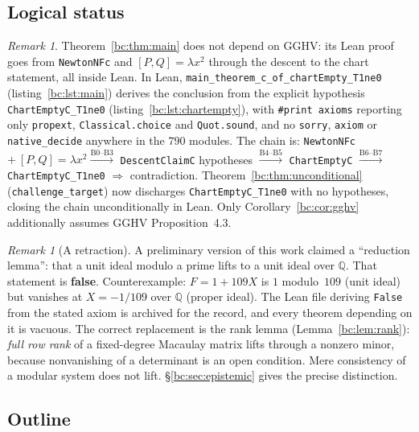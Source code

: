 \documentclass[a4paper,11pt]{article}
\theoremstyle{plain}
\theoremstyle{definition}
\theoremstyle{remark}
\newtheorem{remark}[theorem]{Remark}
\begin{document}
\subsection{Logical status}

\begin{remark}\label{bc:rem:conditional}
Theorem~\ref{bc:thm:main} does not depend on GGHV: its Lean proof goes from \texttt{NewtonNFc} and $[P,Q]=\lambda x^2$ through the descent to the chart statement, all inside Lean. In Lean, \texttt{main\_theorem\_c\_of\_chartEmpty\_T1ne0} (listing~\ref{bc:lst:main}) derives the conclusion from the explicit hypothesis \texttt{ChartEmptyC\_T1ne0} (listing~\ref{bc:lst:chartempty}), with \texttt{\#print axioms} reporting only \texttt{propext}, \texttt{Classical.choice} and \texttt{Quot.sound}, and no \texttt{sorry}, \texttt{axiom} or \texttt{native\_decide} anywhere in the $790$ modules. The chain is:
\texttt{NewtonNFc} $+\ [P,Q]=\lambda x^2 \xrightarrow{\text{B0--B3}}$ \texttt{DescentClaimC} hypotheses $\xrightarrow{\text{B4--B5}}$ \texttt{ChartEmptyC} $\xrightarrow{\text{B6--B7}}$ \texttt{ChartEmptyC\_T1ne0} $\Rightarrow$ contradiction. Theorem~\ref{bc:thm:unconditional} (\texttt{challenge\_target}) now discharges \texttt{ChartEmptyC\_T1ne0} with no hypotheses, closing the chain unconditionally in Lean.
Only Corollary~\ref{bc:cor:gghv} additionally assumes GGHV Proposition~4.3.
\end{remark}

\begin{remark}[A retraction]\label{bc:rem:retraction}
A preliminary version of this work claimed a ``reduction lemma'': that a unit ideal modulo a prime lifts to a unit ideal over $\mathbb{Q}$. That statement is \textbf{false}. Counterexample: $F=1+109X$ is $1$ modulo~$109$ (unit ideal) but vanishes at $X=-1/109$ over $\mathbb{Q}$ (proper ideal). The Lean file deriving \texttt{False} from the stated axiom is archived for the record, and every theorem depending on it is vacuous. The correct replacement is the rank lemma (Lemma~\ref{bc:lem:rank}): \emph{full row rank} of a fixed-degree Macaulay matrix lifts through a nonzero minor, because nonvanishing of a determinant is an open condition. Mere consistency of a modular system does not lift. \S\ref{bc:sec:epistemic} gives the precise distinction.
\end{remark}

\subsection{Outline}
\end{document}
